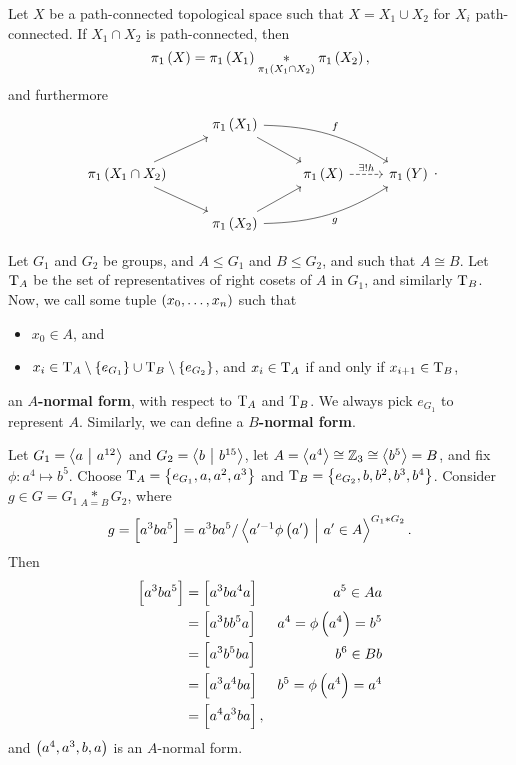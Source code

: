 \begin{theorem}
Let $ X $ be a path-connected topological space such that $ X = X_1 \cup X_2 $ for $ X_i $ path-connected. If $ X_1 \cap X_2 $ is path-connected, then
$$ \pi_1\br{X} = \pi_1\br{X_1} \underset{\pi_1\br{X_1 \cap X_2}}{*} \pi_1\br{X_2}, $$
and furthermore
$$
\begin{tikzcd}
& \pi_1\br{X_1} \arrow{dr} \arrow[bend left=15]{drr}{f} & & \\
\pi_1\br{X_1 \cap X_2} \arrow{ur} \arrow{dr} & & \pi_1\br{X} \arrow[dashed]{r}{\exists !h} & \pi_1\br{Y} \\
& \pi_1\br{X_2} \arrow{ur} \arrow[bend right=15, swap]{urr}{g} & &
\end{tikzcd}.
$$
\end{theorem}


\begin{definition}
Let $ G_1 $ and $ G_2 $ be groups, and $ A \le G_1 $ and $ B \le G_2 $, and such that $ A \cong B $. Let $ \mathrm{T}_A $ be the set of representatives of right cosets of $ A $ in $ G_1 $, and similarly $ \mathrm{T}_B $. Now, we call some tuple $ \br{x_0, \dots, x_n} $ such that
\begin{itemize}
\item $ x_0 \in A $, and
\item $ x_i \in \T_A \setminus \cbr{e_{G_1}} \cup \T_B \setminus \cbr{e_{G_2}} $, and $ x_i \in \mathrm{T}_A $ if and only if $ x_{i + 1} \in \mathrm{T}_B $,
\end{itemize}
an \textbf{$ A $-normal form}, with respect to $ \mathrm{T}_A $ and $ \mathrm{T}_B $. We always pick $ e_{G_1} $ to represent $ A $. Similarly, we can define a \textbf{$ B $-normal form}.
\end{definition}

\begin{example}
Let $ G_1 = \left\langle a \ \middle| \  a^{12} \right\rangle $ and $ G_2 = \left\langle b \ \middle| \  b^{15} \right\rangle $, let $ A = \left\langle a^4 \right\rangle \cong \mathbb{Z}_3 \cong \left\langle b^5 \right\rangle = B $, and fix $ \phi : a^4 \mapsto b^5 $. Choose $ \T_A = \cbr{e_{G_1}, a, a^2, a^3} $ and $ \T_B = \cbr{e_{G_2}, b, b^2, b^3, b^4} $. Consider $ g \in G = G_1 \underset{A = B}{*} G_2 $, where
$$ g = \sbr{a^3ba^5} = a^3ba^5 / \abr{a'^{-1}\phi\br{a'} \st a' \in A}^{G_1 * G_2}. $$
Then
\begin{align*}
\sbr{a^3ba^5}
& = \sbr{a^3ba^4a} & a^5 \in Aa \\
& = \sbr{a^3bb^5a} & a^4 = \phi\br{a^4} = b^5 \\
& = \sbr{a^3b^5ba} & b^6 \in Bb \\
& = \sbr{a^3a^4ba} & b^5 = \phi\br{a^4} = a^4 \\
& = \sbr{a^4a^3ba},
\end{align*}
and $ \br{a^4, a^3, b, a} $ is an $ A $-normal form.
\end{example}

